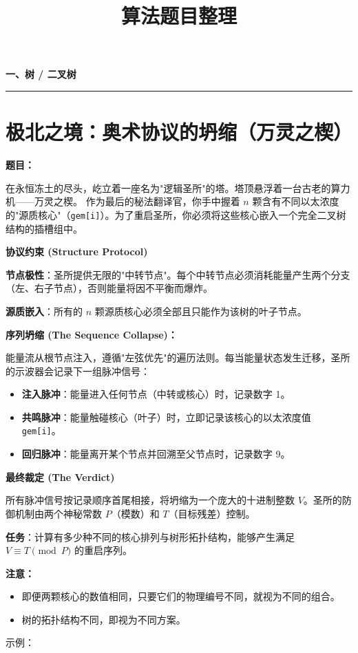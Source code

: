 \documentclass[12pt, a4paper]{article}
\title{\textbf{算法题目整理}}
\author{}
\date{}
\newcommand{\category}[1]{%
  \vspace{1.2cm}
  {\noindent\Large\bfseries #1}
  \vspace{0.2em}\par
  \noindent\rule{\textwidth}{0.8pt}
  \vspace{0.2em}
}
\begin{document}
\maketitle
\thispagestyle{empty}


\category{一、树 / 二叉树}

\section{极北之境：奥术协议的坍缩（万灵之楔）}

\noindent\textbf{题目：}

在永恒冻土的尽头，屹立着一座名为"逻辑圣所"的塔。塔顶悬浮着一台古老的算力机——万灵之楔。
作为最后的秘法翻译官，你手中握着 $n$ 颗含有不同以太浓度的"源质核心"（\texttt{gem[i]}）。为了重启圣所，你必须将这些核心嵌入一个完全二叉树结构的插槽组中。

\textbf{协议约束 (Structure Protocol)}

\textbf{节点极性}：圣所提供无限的"中转节点"。每个中转节点必须消耗能量产生两个分支（左、右子节点），否则能量将因不平衡而爆炸。

\textbf{源质嵌入}：所有的 $n$ 颗源质核心必须全部且只能作为该树的叶子节点。

\textbf{序列坍缩 (The Sequence Collapse)：}

能量流从根节点注入，遵循"左弦优先"的遍历法则。每当能量状态发生迁移，圣所的示波器会记录下一组脉冲信号：
\begin{itemize}[leftmargin=2em]
  \item \textbf{注入脉冲}：能量进入任何节点（中转或核心）时，记录数字 1。
  \item \textbf{共鸣脉冲}：能量触碰核心（叶子）时，立即记录该核心的以太浓度值 \texttt{gem[i]}。
  \item \textbf{回归脉冲}：能量离开某个节点并回溯至父节点时，记录数字 9。
\end{itemize}

\textbf{最终裁定 (The Verdict)}

所有脉冲信号按记录顺序首尾相接，将坍缩为一个庞大的十进制整数 $V$。圣所的防御机制由两个神秘常数 $P$（模数）和 $T$（目标残差）控制。

\textbf{任务}：计算有多少种不同的核心排列与树形拓扑结构，能够产生满足 $V \equiv T \pmod{P}$ 的重启序列。

\textbf{注意：}
\begin{itemize}[leftmargin=2em]
  \item 即便两颗核心的数值相同，只要它们的物理编号不同，就视为不同的组合。
  \item 树的拓扑结构不同，即视为不同方案。
\end{itemize}
示例：
\end{document}
